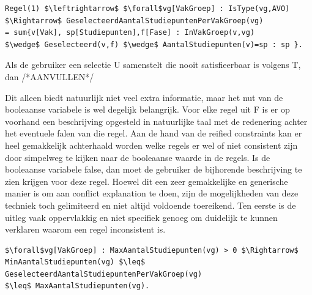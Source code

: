 \lstset{basicstyle=\scriptsize}
\begin{lstlisting}[mathescape, caption=IDP Reified Constraint Example, frame=single]
Regel(1) $\leftrightarrow$ $\forall$vg[VakGroep] : IsType(vg,AVO) $\Rightarrow$ GeselecteerdAantalStudiepuntenPerVakGroep(vg) 
= sum{v[Vak], sp[Studiepunten],f[Fase] : InVakGroep(v,vg) 
$\wedge$ Geselecteerd(v,f) $\wedge$ AantalStudiepunten(v)=sp : sp }.
\end{lstlisting}
Als de gebruiker een selectie U samenstelt die nooit satisfieerbaar is volgens T, dan /*AANVULLEN*/

Dit alleen biedt natuurlijk niet veel extra informatie, maar het nut van de booleaanse variabele is wel degelijk belangrijk. Voor elke regel uit F is er op voorhand een beschrijving opgesteld in natuurlijke taal met de redenering achter het eventuele falen van die regel. Aan de hand van de reified constraints kan er heel gemakkelijk achterhaald worden welke regels er wel of niet consistent zijn door simpelweg te kijken naar de booleaanse waarde in de regels. Is de booleaanse variabele false, dan moet de gebruiker de bijhorende beschrijving te zien krijgen voor deze regel. Hoewel dit een zeer gemakkelijke en generische manier is om aan conflict explanation te doen, zijn de mogelijkheden van deze techniek toch gelimiteerd en niet altijd voldoende toereikend. Ten eerste is de uitleg vaak oppervlakkig en niet specifiek genoeg om duidelijk te kunnen verklaren waarom een regel inconsistent is. 
\lstset{basicstyle=\scriptsize}
\begin{lstlisting}[mathescape, caption=Reified constraint Shortcomings, frame=single]
$\forall$vg[VakGroep] : MaxAantalStudiepunten(vg) > 0 $\Rightarrow$ 
MinAantalStudiepunten(vg) $\leq$ GeselecteerdAantalStudiepuntenPerVakGroep(vg) 
$\leq$ MaxAantalStudiepunten(vg).
\end{lstlisting}
